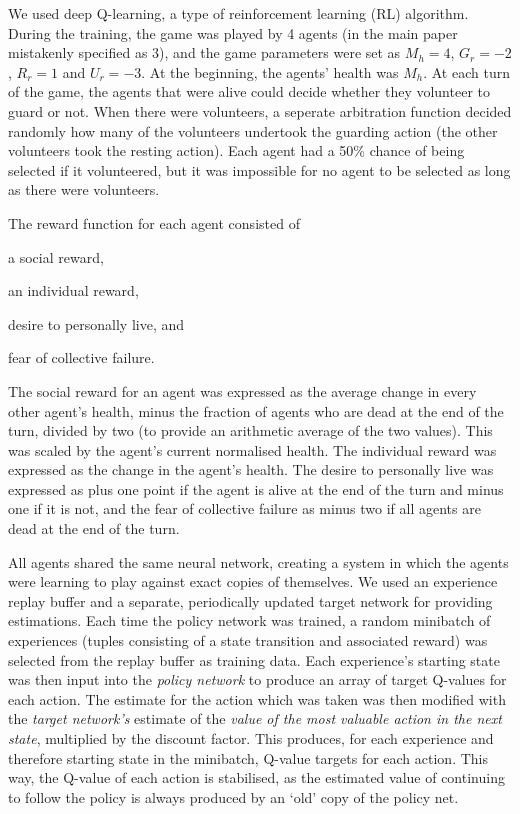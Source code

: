 We used deep Q-learning, a type of reinforcement learning (RL) algorithm.
During the training, the game was played by 4 agents (in the main paper
mistakenly specified as 3), and the game parameters were set as $M_h = 4$,
$G_r = -2$, $R_r = 1$ and $U_r = -3$.
%
At the beginning, the agents' health was $M_h$.
%
At each turn of the game, the agents that were alive could decide whether they
volunteer to guard or not. When there were volunteers, a seperate arbitration
function decided randomly how many of the volunteers undertook the guarding
action (the other volunteers took the resting action). Each agent had a 50\%
chance of being selected if it volunteered, but it was impossible for no agent
to be selected as long as there were volunteers.

The reward function for each agent consisted of
\begin{inparaenum}[\it (i)]
\item  a social reward,
\item an individual reward,
\item desire to personally live, and
\item fear of collective failure.
\end{inparaenum}
The social reward for an agent was expressed as the average change in every
other agent's health, minus the fraction of agents who are dead at the end of
the turn, divided by two (to provide an arithmetic average of the two
values). This was scaled by the agent's current normalised health. The
individual reward was expressed as the change in the agent's health. The desire
to personally live was expressed as plus one point if the agent is alive at the
end of the turn and minus one if it is not, and the fear of collective failure
as minus two if all agents are dead at the end of the turn.



All agents shared the same neural network, creating a system in which the
agents were learning to play against exact copies of themselves.
%
We used an experience replay buffer and a separate, periodically updated target
network for providing estimations.
%
Each time the policy network was trained, a random minibatch of experiences
(tuples consisting of a state transition and associated reward) was selected
from the replay buffer as training data.
%
Each experience's starting state was then input into the \emph{policy network}
to produce an array of target Q-values for each action. The estimate for
the action which was taken was then modified with the \emph{target network's}
estimate of the \emph{value of the most valuable action in the next state},
multiplied by the discount factor. This produces, for each experience and
therefore starting state in the minibatch, Q-value targets for each action.
%
This way, the Q-value of each action is stabilised, as the estimated value of
continuing to follow the policy is always produced by an `old' copy of the
policy net.

